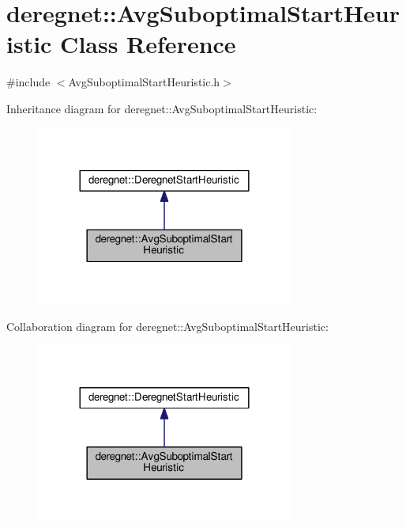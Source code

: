 \hypertarget{classderegnet_1_1AvgSuboptimalStartHeuristic}{}\section{deregnet\+:\+:Avg\+Suboptimal\+Start\+Heuristic Class Reference}
\label{classderegnet_1_1AvgSuboptimalStartHeuristic}


{\ttfamily \#include $<$Avg\+Suboptimal\+Start\+Heuristic.\+h$>$}



Inheritance diagram for deregnet\+:\+:Avg\+Suboptimal\+Start\+Heuristic\+:\nopagebreak
\begin{figure}[H]
\begin{center}
\leavevmode
\includegraphics[width=240pt]{classderegnet_1_1AvgSuboptimalStartHeuristic__inherit__graph}
\end{center}
\end{figure}


Collaboration diagram for deregnet\+:\+:Avg\+Suboptimal\+Start\+Heuristic\+:\nopagebreak
\begin{figure}[H]
\begin{center}
\leavevmode
\includegraphics[width=240pt]{classderegnet_1_1AvgSuboptimalStartHeuristic__coll__graph}
\end{center}
\end{figure}
